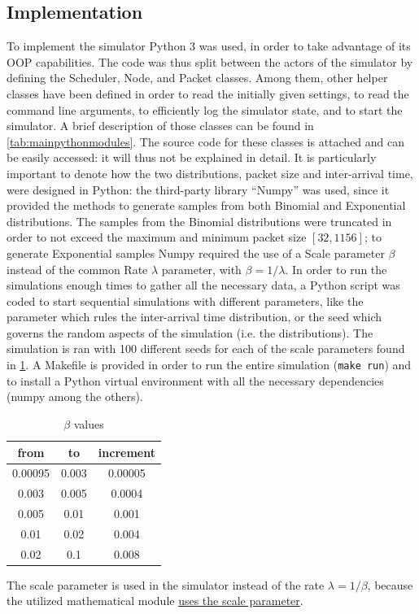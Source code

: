 \documentclass[conference]{IEEEtran}
\begin{document}
\subsection{Implementation}\label{sec:implementation}
To implement the simulator Python 3 was used, in order to take advantage of its OOP capabilities. The code was thus split between the actors of the simulator by defining the Scheduler, Node, and Packet classes. Among them, other helper classes have been defined in order to read the initially given settings, to read the command line arguments, to efficiently log the simulator state, and to start the simulator. A brief description of those classes can be found in \cref{tab:mainpythonmodules}. The source code for these classes is attached and can be easily accessed: it will thus not be explained in detail. It is particularly important to denote how the two distributions, packet size and inter-arrival time, were designed in Python: the third-party library “Numpy” was used, since it provided the methods to generate samples from both Binomial and Exponential distributions. The samples from the Binomial distributions were truncated in order to not exceed the maximum and minimum packet size \([32, 1156]\); to generate Exponential samples Numpy required the use of a Scale parameter \(\beta\) instead of the common Rate \(\lambda\) parameter, with \(\beta=1/\lambda\). In order to run the simulations enough times to gather all the necessary data, a Python script was coded to start sequential simulations with different parameters, like the parameter which rules the inter-arrival time distribution, or the seed which governs the random aspects of the simulation (i.e. the distributions). The simulation is ran with 100 different seeds for each of the scale parameters found in \cref{tab:scalevalues}. A Makefile is provided in order to run the entire simulation (\texttt{make run}) and to install a Python virtual environment with all the necessary dependencies (numpy among the others).

\begin{table}
    \centering
    \caption{\(\beta\) values}
    \label{tab:scalevalues}
    \begin{tabular}{cc|c}
        \toprule
        from & to & increment \\
        \midrule
        \num{0.00095} & \num{0.003} & \num{0.00005} \\
        \num{0.003} & \num{0.005} & \num{0.0004} \\
        \num{0.005} & \num{0.01} & \num{0.001} \\
        \num{0.01} & \num{0.02} & \num{0.004} \\
        \num{0.02} & \num{0.1} & \num{0.008} \\
        \bottomrule
    \end{tabular}
    
    The scale parameter is used in the simulator instead of the rate \(\lambda=1/\beta\), because the utilized mathematical module \href{https://docs.scipy.org/doc/numpy-1.13.0/reference/generated/numpy.random.exponential.html}{uses the scale parameter}.
\end{table}
\end{document}
